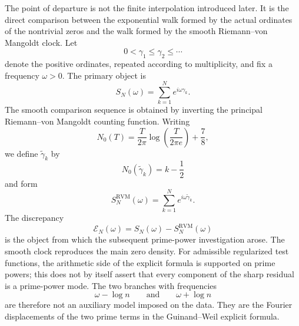 \documentclass[11pt]{amsart}
\numberwithin{equation}{section}
\theoremstyle{plain}
\theoremstyle{definition}
\theoremstyle{remark}
\newcommand{\1}{\mathbf{1}}
\begin{document}
The point of departure is not the finite interpolation introduced later.
It is the direct comparison between the exponential walk formed by the
actual ordinates of the nontrivial zeros and the walk formed by the smooth
Riemann--von Mangoldt clock.  Let
\begin{equation}
0<\gamma_1\leq\gamma_2\leq\cdots
\label{eq:intro_ordered_ordinates}
\end{equation}
denote the positive ordinates, repeated according to multiplicity, and fix a
frequency \(\omega>0\).  The primary object is
\begin{equation}
S_N(\omega)
=
\sum_{k=1}^{N}e^{i\omega\gamma_k}.
\label{eq:intro_SN_omega}
\end{equation}
The smooth comparison sequence is obtained by inverting the principal
Riemann--von Mangoldt counting function.  Writing
\begin{equation}
N_0(T)
=
\frac{T}{2\pi}\log\!\left(\frac{T}{2\pi e}\right)+\frac78,
\label{eq:intro_N0}
\end{equation}
we define \(\widetilde\gamma_k\) by
\begin{equation}
N_0(\widetilde\gamma_k)=k-\frac12
\label{eq:intro_rvm_inverse_definition}
\end{equation}
and form
\begin{equation}
S_N^{\mathrm{RVM}}(\omega)
=
\sum_{k=1}^{N}e^{i\omega\widetilde\gamma_k}.
\label{eq:intro_SN_RVM}
\end{equation}
The discrepancy
\begin{equation}
\mathcal E_N(\omega)
=
S_N(\omega)-S_N^{\mathrm{RVM}}(\omega)
\label{eq:intro_discrepancy}
\end{equation}
is the object from which the subsequent prime-power investigation arose.
The smooth clock reproduces the main zero density.  For admissible
regularized test functions, the arithmetic side of the explicit formula is
supported on prime powers; this does not by itself assert that every component
of the sharp residual is a prime-power mode.  The two branches with frequencies
\begin{equation}
\omega-\log n
\qquad\text{and}\qquad
\omega+\log n
\label{eq:intro_two_frequencies}
\end{equation}
are therefore not an auxiliary model imposed on the data.  They are the
Fourier displacements of the two prime terms in the Guinand--Weil explicit
formula.
\end{document}
